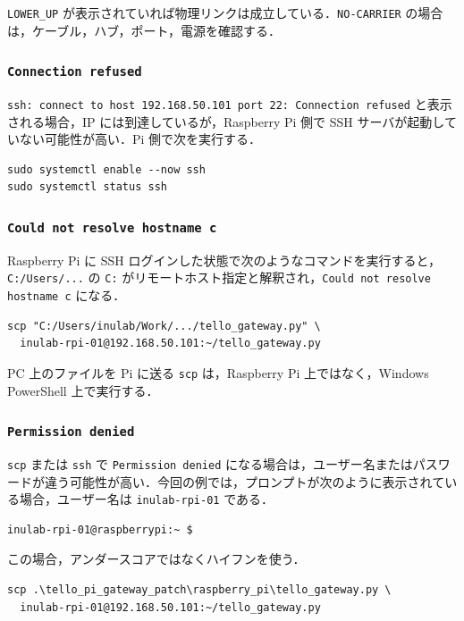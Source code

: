 \texttt{LOWER\_UP} が表示されていれば物理リンクは成立している．\texttt{NO-CARRIER} の場合は，ケーブル，ハブ，ポート，電源を確認する．

\subsubsection{\texttt{Connection refused}}

\texttt{ssh: connect to host 192.168.50.101 port 22: Connection refused} と表示される場合，IP には到達しているが，Raspberry Pi 側で SSH サーバが起動していない可能性が高い．Pi 側で次を実行する．

\begin{lstlisting}
sudo systemctl enable --now ssh
sudo systemctl status ssh
\end{lstlisting}

\subsubsection{\texttt{Could not resolve hostname c}}

Raspberry Pi に SSH ログインした状態で次のようなコマンドを実行すると，\texttt{C:/Users/...} の \texttt{C:} がリモートホスト指定と解釈され，\texttt{Could not resolve hostname c} になる．

\begin{lstlisting}
scp "C:/Users/inulab/Work/.../tello_gateway.py" \
  inulab-rpi-01@192.168.50.101:~/tello_gateway.py
\end{lstlisting}

PC 上のファイルを Pi に送る \texttt{scp} は，Raspberry Pi 上ではなく，Windows PowerShell 上で実行する．

\subsubsection{\texttt{Permission denied}}

\texttt{scp} または \texttt{ssh} で \texttt{Permission denied} になる場合は，ユーザー名またはパスワードが違う可能性が高い．今回の例では，プロンプトが次のように表示されている場合，ユーザー名は \texttt{inulab-rpi-01} である．

\begin{lstlisting}
inulab-rpi-01@raspberrypi:~ $
\end{lstlisting}

この場合，アンダースコアではなくハイフンを使う．

\begin{lstlisting}
scp .\tello_pi_gateway_patch\raspberry_pi\tello_gateway.py \
  inulab-rpi-01@192.168.50.101:~/tello_gateway.py
\end{lstlisting}

